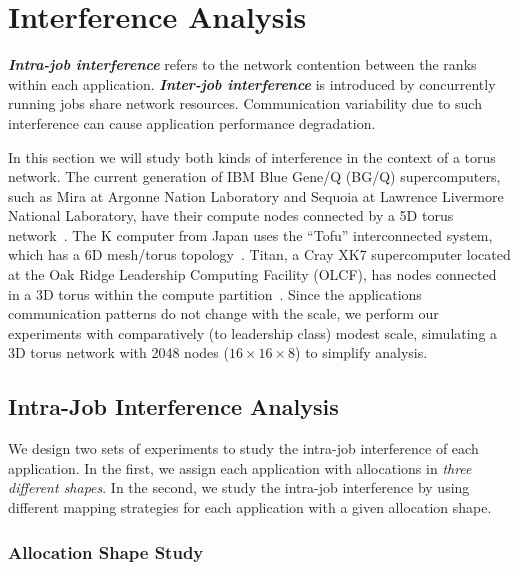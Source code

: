 \section{Interference Analysis}
\label{sec:interference}

\textbf{\emph{Intra-job interference}} refers to the network 
contention between the ranks within each application. 
\textbf{\emph{Inter-job interference}} is introduced by concurrently 
running jobs share network resources. 
Communication variability due to such interference can 
cause application performance degradation.

In this section we will study both kinds of interference 
in the context of a torus network. 
The current generation of IBM Blue Gene/Q (BG/Q) supercomputers, 
such as Mira at Argonne Nation Laboratory and 
Sequoia at Lawrence Livermore National Laboratory, 
have their compute nodes connected by a 5D torus network~\cite{bgq}. 
The K computer from Japan uses the ``Tofu'' interconnected system, 
which has a 6D mesh/torus topology~\cite{tofu}. 
Titan, a Cray XK7 supercomputer located at the Oak Ridge Leadership Computing Facility (OLCF), 
has nodes connected in a 3D torus within the compute partition~\cite{titan}. 
Since the applications communication patterns do not change with the scale,
we perform our experiments with comparatively (to leadership class) modest scale,
simulating a 3D torus network with 2048 nodes ($16\times 16 \times 8$) to simplify analysis.


\subsection{Intra-Job Interference Analysis}
\label{sec: introjob}

We design two sets of experiments to study the 
intra-job interference of each application. 
In the first, 
we assign each application with allocations in \emph{three different shapes}. 
In the second, 
we study the intra-job interference by using different 
mapping strategies for each application with a given allocation shape. 



\subsubsection{Allocation Shape Study}


